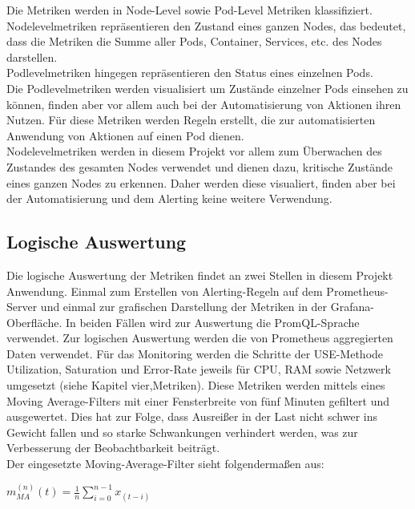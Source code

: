 \documentclass[a4paper,10pt]{scrartcl}
\begin{document}
Die Metriken werden in Node-Level sowie Pod-Level Metriken klassifiziert.\\
Nodelevelmetriken repräsentieren den Zustand eines ganzen Nodes, das bedeutet, dass die Metriken die Summe aller Pods, Container, Services, etc. des Nodes darstellen.\\
Podlevelmetriken hingegen repräsentieren den Status eines einzelnen Pods.\\
Die Podlevelmetriken werden visualisiert um Zustände einzelner Pods einsehen zu können, finden aber vor allem auch bei der Automatisierung von Aktionen ihren Nutzen. Für diese Metriken werden Regeln erstellt, die zur automatisierten Anwendung von Aktionen auf einen Pod dienen.\\
Nodelevelmetriken werden in diesem Projekt vor allem zum Überwachen des Zustandes des gesamten Nodes verwendet und dienen dazu, kritische Zustände eines ganzen Nodes zu erkennen. Daher werden diese visualiert, finden aber bei der Automatisierung und dem Alerting keine weitere Verwendung.

\subsection{Logische Auswertung}

Die logische Auswertung der Metriken findet an zwei Stellen in diesem Projekt Anwendung. Einmal zum Erstellen von Alerting-Regeln auf dem Prometheus-Server und einmal zur grafischen Darstellung der Metriken in der Grafana-Oberfläche. In beiden Fällen wird zur Auswertung die PromQL-Sprache verwendet.
Zur logischen Auswertung werden die von Prometheus aggregierten Daten verwendet. Für das Monitoring werden die Schritte der USE-Methode Utilization, Saturation und Error-Rate jeweils für CPU, RAM sowie Netzwerk umgesetzt (siehe Kapitel vier,Metriken). Diese Metriken werden mittels eines \glqq Moving Average\grqq-Filters mit einer Fensterbreite von fünf Minuten gefiltert und ausgewertet. Dies hat zur Folge, dass Ausreißer in der Last nicht schwer ins Gewicht fallen und so starke Schwankungen verhindert werden, was zur Verbesserung der Beobachtbarkeit beiträgt.\\
Der eingesetzte \glqq Moving-Average\grqq-Filter sieht folgendermaßen aus:\\

\begin{Huge}
\(
\displaystyle{m^{(n)}_{MA}(t) = \frac{1}{n}{\sum\limits_{i=0}^{{n-1}} x_{(t-i)}} }
\)\\
\end{Huge}
\end{document}
